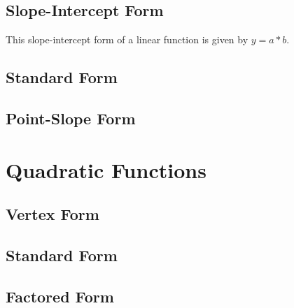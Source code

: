 \documentclass[11pt]{article}
\begin{document}
	\subsection{Slope-Intercept Form}
	This slope-intercept form of a linear function is given by $y=a*b$.
	\subsection{Standard Form}
	\subsection{Point-Slope Form}
\section{Quadratic Functions}
	\subsection{Vertex Form}
	\subsection{Standard Form}
	\subsection{Factored Form}
\end{document}
